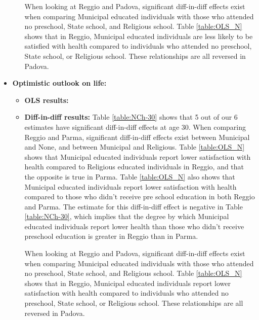 \documentclass[11pt]{article}
\begin{document}
\begin{itemize}
\begin{itemize}
	 When looking at Reggio and Padova, significant diff-in-diff effects exist when comparing Municipal educated individuals with those who attended no preschool, State school, and Religious school. Table \ref{table:OLS_N} shows that in Reggio, Municipal educated individuals are less likely to be satisfied with health compared to individuals who attended no preschool, State school, or Religious school. These relationships are all reversed in Padova. 
	
	\end{itemize}

\item \textbf{Optimistic outlook on life:} 
	
	\begin{itemize}
	\item \textbf{OLS results:} 
	
	\item \textbf{Diff-in-diff results:}  Table \ref{table:NCh-30} shows that 5 out of our 6 estimates have significant diff-in-diff effects at age 30. When comparing Reggio and Parma, significant diff-in-diff effects exist between Municipal and None, and between Municipal and Religious. Table \ref{table:OLS_N} shows that Municipal educated individuals report lower satisfaction with health compared to Religious educated individuals in Reggio, and that the opposite is true in Parma.  Table \ref{table:OLS_N} also shows that  Municipal educated individuals report lower satisfaction with health compared to those who didn't receive pre school education in both Reggio and Parma. The estimate for this diff-in-diff effect is negative in Table \ref{table:NCh-30}, which implies that the degree by which Municipal educated individuals report lower health than those who didn't receive preschool education is greater in Reggio than in Parma.
	
	 When looking at Reggio and Padova, significant diff-in-diff effects exist when comparing Municipal educated individuals with those who attended no preschool, State school, and Religious school. Table \ref{table:OLS_N} shows that in Reggio, Municipal educated individuals report lower satisfaction with health compared to individuals who attended no preschool, State school, or Religious school. These relationships are all reversed in Padova. 
	
	\end{itemize}

\end{itemize}

\clearpage
\end{document}
